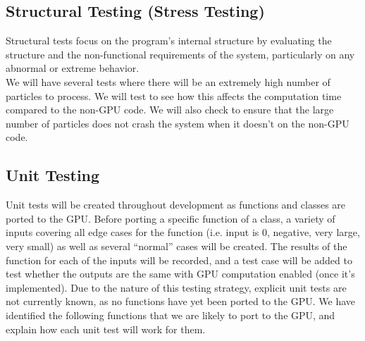 \documentclass[12pt]{article}
\begin{document}
\subsection{Structural Testing (Stress Testing)} %
Structural tests focus on the program's internal structure by evaluating the structure and the non-functional requirements of the system, particularly on any abnormal or extreme behavior.\\ 

We will have several tests where there will be an extremely high number of particles to process. We will test to see how this affects the computation time compared to the non-GPU code. We will also check to ensure that the large number of particles does not crash the system when it doesn't on the non-GPU code.

\subsection{Unit Testing} %
Unit tests will be created throughout development as functions and classes are ported to the GPU. Before porting a specific function of a class, a variety of inputs covering all edge cases for the function (i.e. input is 0, negative, very large, very small) as well as several ``normal'' cases will be created. The results of the function for each of the inputs will be recorded, and a test case will be added to test whether the outputs are the same with GPU computation enabled (once it's implemented). Due to the nature of this testing strategy, explicit unit tests are not currently known, as no functions have yet been ported to the GPU. We have identified the following functions that we are likely to port to the GPU, and explain how each unit test will work for them.
\end{document}
